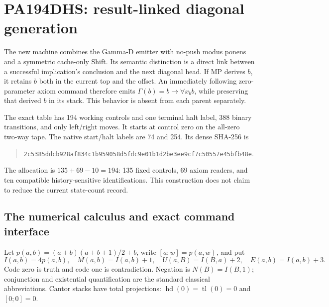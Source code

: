 \section{PA194DHS: result-linked diagonal generation}

The new machine combines the Gamma-D emitter with no-push modus ponens and
a symmetric cache-only Shift. Its semantic distinction is a direct link
between a successful implication's conclusion and the next diagonal head.
If MP derives $b$, it retains $b$ both in the current top and the offset.
An immediately following zero-parameter axiom command therefore emits
$\Gamma(b)=b\to\forall x_b b$, while preserving that derived $b$ in its
stack. This behavior is absent from each parent separately.

The exact table has 194 working controls and one terminal halt label,
388 binary transitions, and only left/right moves. It starts at control
zero on the all-zero two-way tape. The native start/halt labels are
74 and 254. Its dense SHA-256 is
\begin{quote}\small\nolinkurl{2c5385ddcb928af834c1b959058d5fdc9e01b1d2be3ee9cf7c50557e45bfb48e}.\end{quote}
The allocation is $135+69-10=194$: 135 fixed controls, 69 axiom readers,
and ten compatible history-sensitive identifications. This construction
does not claim to reduce the current state-count record.

\subsection{The numerical calculus and exact command interface}

Let $p(a,b)=(a+b)(a+b+1)/2+b$, write $[a;w]=p(a,w)$, and put
\[
 I(a,b)=4p(a,b),\quad M(a,b)=I(a,b)+1,\quad
 U(a,B)=I(B,a)+2,\quad E(a,b)=I(a,b)+3.
\]
Code zero is truth and code one is contradiction. Negation is
$N(B)=I(B,1)$; conjunction and existential quantification are the standard
classical abbreviations. Cantor stacks have total projections:
$\operatorname{hd}(0)=\operatorname{tl}(0)=0$ and $[0;0]=0$.

